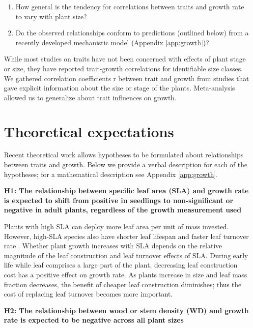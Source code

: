 \documentclass[a4paper]{article}\usepackage[]{graphicx}\usepackage[]{color}
\begin{document}
\begin{enumerate}
  \item How general is the tendency for correlations between traits and growth rate to vary with plant size?
  \item Do the observed relationships conform to predictions (outlined below) from a recently developed  mechanistic
model \citep{Falster:2011ii, falster:2013}(Appendix \ref{app:growth})?
\end{enumerate}

While most studies on traits have not been concerned with effects of plant stage or size, they have reported trait-growth correlations for identifiable size classes. We gathered correlation coefficients r between trait and growth from studies that gave explicit information about the size or stage of the plants. Meta-analysis allowed us to generalize about trait influences on growth.

\section*{Theoretical expectations}\label{theory}

Recent theoretical work \citep{Falster:2011ii} allows hypotheses to be formulated about relationships between traits and growth. Below we provide a verbal description for each of the hypotheses; for a mathematical description see Appendix \ref{app:growth}.

\textbf{H1: The relationship between specific leaf area (SLA) and growth rate is expected to shift from positive in seedlings to non-significant or negative in adult plants, regardless of the growth measurement used}

Plants with high SLA can deploy more leaf area per unit of mass invested. However, high-SLA species also have shorter leaf lifespan and faster leaf turnover rate \citep{Wright:2004jb}. Whether plant growth increases with SLA depends on the relative magnitude of the leaf construction and leaf turnover effects of SLA. During early life while leaf comprises a large part of the plant, decreasing leaf construction cost has a positive effect on growth rate. As plants increase in size and leaf mass fraction decreases, the benefit of cheaper leaf construction diminishes; thus the cost of replacing leaf turnover becomes more important.

\textbf{H2: The relationship between wood or stem density (WD) and growth rate is expected to be negative across all plant sizes}
\end{document}
